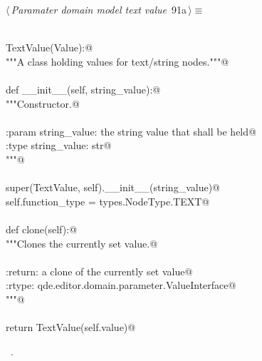 \documentclass[
    a4paper,      %
    10pt,         %
    openright,    %
    notitlepage,  %
    parskip=half, %
]{scrreprt}       %
\theoremstyle{definition}                    %
\begin{document}
\begin{flushleft} \small
\begin{minipage}{\linewidth}\label{scrap148}\raggedright\small
{} $\langle\,${\itshape Paramater domain model text value}\nobreak\ {\footnotesize {91a}}$\,\rangle\equiv$
\vspace{-1exm}
\begin{list}{}{} \item
\mbox{}\lstinline@@\\
\mbox{}\lstinline@class TextValue(Value):@\\
\mbox{}\lstinline@    """A class holding values for text/string nodes."""@\\
\mbox{}\lstinline@@\\
\mbox{}\lstinline@    def __init__(self, string_value):@\\
\mbox{}\lstinline@        """Constructor.@\\
\mbox{}\lstinline@@\\
\mbox{}\lstinline@        :param string_value: the string value that shall be held@\\
\mbox{}\lstinline@        :type  string_value: str@\\
\mbox{}\lstinline@        """@\\
\mbox{}\lstinline@@\\
\mbox{}\lstinline@        super(TextValue, self).__init__(string_value)@\\
\mbox{}\lstinline@        self.function_type = types.NodeType.TEXT@\\
\mbox{}\lstinline@@\\
\mbox{}\lstinline@    def clone(self):@\\
\mbox{}\lstinline@        """Clones the currently set value.@\\
\mbox{}\lstinline@@\\
\mbox{}\lstinline@        :return: a clone of the currently set value@\\
\mbox{}\lstinline@        :rtype:  qde.editor.domain.parameter.ValueInterface@\\
\mbox{}\lstinline@        """@\\
\mbox{}\lstinline@@\\
\mbox{}\lstinline@        return TextValue(self.value)@{\NWsep}
\end{list}
\vspace{-1.5ex}
\footnotesize
\begin{list}{}{\setlength{\itemsep}{-\parsep}\setlength{\itemindent}{-\leftmargin}}
\item \NWtxtMacroRefIn\ .

\item{}
\end{list}
\end{minipage}\vspace{4ex}
\end{flushleft}
\end{document}
